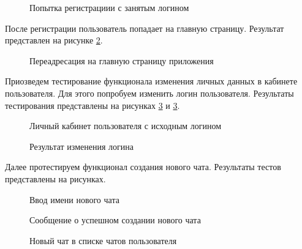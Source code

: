 \begin{figure}[H]
	\caption{Попытка регистрациии с занятым логином}
	\label{signup_test3:image}
\end{figure}

После регистрации пользователь попадает на главную страницу. Результат представлен на рисунке \ref{signup_test4:image}.

\begin{figure}[H]
	\caption{Переадресация на главную страницу приложения}
	\label{signup_test4:image}
\end{figure}

Приозведем тестирование функционала изменения личных данных в кабинете пользователя. Для этого попробуем изменить логин пользователя. Результаты тестирования представлены на рисунках \ref{cabinet_test1:image} и \ref{cabinet_test1:image}.


\begin{figure}[H]
	\caption{Личный кабинет пользователя с исходным логином}
	\label{cabinet_test1:image}
\end{figure}

\begin{figure}[H]
	\caption{Результат изменения логина}
	\label{cabinet_test2:image}
\end{figure}

Далее протестируем функционал создания нового чата. Результаты тестов представлены на рисунках.

\begin{figure}[H]
	\caption{Ввод имени нового чата}
	\label{newChat_test1:image}
\end{figure}

\begin{figure}[H]
	\caption{Сообщение о успешном создании нового чата}
	\label{newChat_test2:image}
\end{figure}

\begin{figure}[H]
	\caption{Новый чат в списке чатов пользователя}
	\label{newChat_test3:image}
\end{figure}

